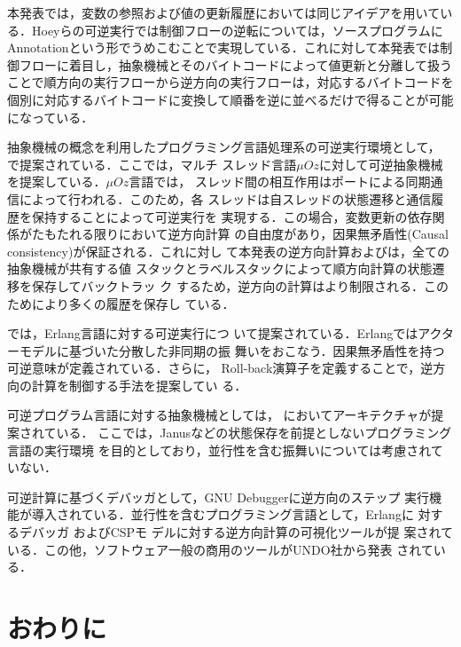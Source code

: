 \documentclass[submit,PRO]{ipsj}
\begin{document}
本発表では，変数の参照および値の更新履歴においては同じアイデアを用いてい
る．Hoeyらの可逆実行では制御フローの逆転については，ソースプログラムに
Annotationという形でうめこむことで実現している．これに対して本発表では制
御フローに着目し，抽象機械とそのバイトコードによって値更新と分離して扱う
ことで順方向の実行フローから逆方向の実行フローは，対応するバイトコードを
個別に対応するバイトコードに変換して順番を逆に並べるだけで得ることが可能
になっている．

抽象機械の概念を利用したプログラミング言語処理系の可逆実行環境として，
\cite{DBLP:conf/forte/LienhardtLMS12}で提案されている．ここでは，マルチ
スレッド言語$\mu Oz$に対して可逆抽象機械を提案している．$\mu Oz$言語では，
スレッド間の相互作用はポートによる同期通信によって行われる．このため，各
スレッドは自スレッドの状態遷移と通信履歴を保持することによって可逆実行を
実現する．この場合，変数更新の依存関係がたもたれる限りにおいて逆方向計算
の自由度があり，因果無矛盾性(Causal consistency)が保証される．これに対し
て本発表の逆方向計算および\cite{Hoey20PHD}は，全ての抽象機械が共有する値
スタックとラベルスタックによって順方向計算の状態遷移を保存してバックトラッ
ク
\cite{DBLP:journals/software/AgrawalDS91,DBLP:journals/corr/abs-1709-00828}
するため，逆方向の計算はより制限される．このためにより多くの履歴を保存し
ている．

\cite{DBLP:journals/jlp/LaneseNPV18}では，Erlang言語に対する可逆実行につ
いて提案されている．Erlangではアクターモデルに基づいた分散した非同期の振
舞いをおこなう．因果無矛盾性を持つ可逆意味が定義されている．さらに，
Roll-back演算子を定義することで，逆方向の計算を制御する手法を提案してい
る．

可逆プログラム言語に対する抽象機械としては，
\cite{DBLP:conf/csr/AxelsenGY07}においてアーキテクチャが提案されている．
ここでは，Janusなどの状態保存を前提としないプログラミング言語の実行環境
を目的としており，並行性を含む振舞いについては考慮されていない．

可逆計算に基づくデバッガとして，GNU Debugger\cite{GDB}に逆方向のステップ
実行機能が導入されている．並行性を含むプログラミング言語として，Erlangに
対するデバッガ
\cite{DBLP:conf/flops/Lanese0PV18,DBLP:conf/forte/LanesePV19}およびCSPモ
デルに対する逆方向計算の可視化ツール\cite{DBLP:conf/rc/Galindo0ST20}が提
案されている．この他，ソフトウェア一般の商用のツールがUNDO社から発表
\cite{UNDODebugger}されている．

\section{おわりに}
\end{document}
